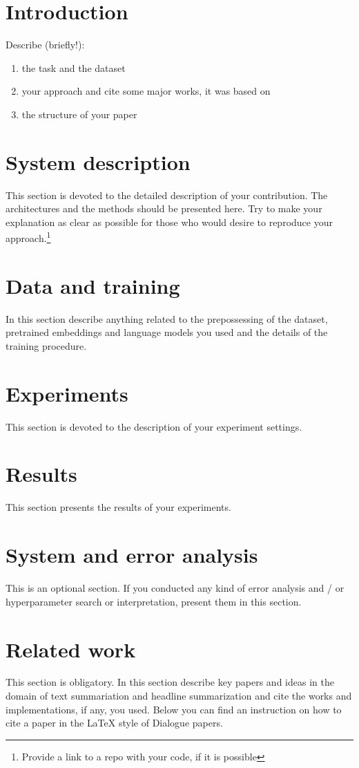 \documentclass{dialogue}
\begin{document}

\section{Introduction}
Describe (briefly!):
\begin{enumerate}
    \item the task and the dataset
    \item your approach and cite some major works, it was based on
    \item the structure of your paper
\end{enumerate}

\section{System description}
This section is devoted to the detailed description of your contribution. The architectures and the methods should be presented here. Try to make your explanation as clear as possible for those who would desire to reproduce your approach.\footnote{Provide a link to a repo with your code, if it is possible}

\section{Data and training}
In this section describe anything related to the prepossessing of the dataset, pretrained embeddings and language models you used and the details of the training procedure.

\section{Experiments}
This section is devoted to the description of your experiment settings.

\section{Results}
This section presents the results of your experiments.

\section{System and error analysis}
This is an optional section. If you conducted any kind of error analysis and / or hyperparameter search or interpretation, present them in this section.

\section{Related work}
This section is obligatory. In this section describe key papers and ideas in the domain of text summariation and headline summarization and cite the works and implementations, if any, you used. Below you can find an instruction on how to cite a paper in the {\LaTeX} style of Dialogue papers.
\end{document}
